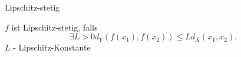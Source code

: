 \documentclass[class=article, crop=false]{standalone}
\begin{document}
\begin{zettel}{Lipschitz-stetig}
\begin{flashcard}
    \begin{definition}
        $f$ ist Lipschitz-stetig, falls
        \[
            \exists L > 0 d_Y (f(x_1),f(x_2)) \leq L d_X (x_1,x_2) 
        .\]
        $L$ - Lipschitz-Konstante
    \end{definition}
\end{flashcard}
\end{zettel}
\end{document}
